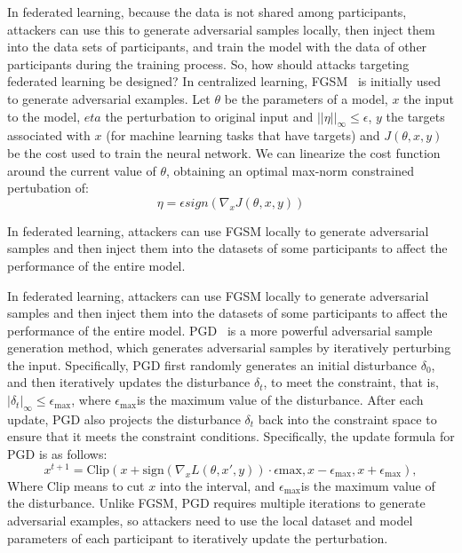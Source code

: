 \documentclass[a4paper,fleqn]{cas-dc}
\begin{document}
In federated learning, because the data is not shared
among participants, attackers can use this to generate
adversarial samples locally, then inject them into the data
sets of participants, and train the model with the data of
other participants during the training process.
So, how should attacks targeting federated learning be
designed? In centralized learning, FGSM~\cite{goodfellow2014explaining} is initially
used to generate adversarial examples. Let $\theta$ be the parameters of a model, $x$ the input to the model,
$eta$ the perturbation to original input and $||\eta||_\infty \le \epsilon$,
$y$ the targets associated with $x$ (for machine learning tasks that have targets)
and $J(\theta, x, y)$ be the cost used to train the neural network.
We can linearize the cost function around the current value of $\theta$,
obtaining an optimal max-norm constrained pertubation of:
\begin{equation}
	\eta = \epsilon sign(\nabla_x J(\theta,x,y))
\end{equation}

In federated learning, attackers can use FGSM locally to generate
adversarial samples and then inject them into the datasets of some participants
to affect the performance of the entire model.

In federated learning, attackers can use FGSM locally
to generate adversarial samples and then inject them into
the datasets of some participants to affect the performance
of the entire model. PGD~\cite{madry2017towards} is a more powerful adversarial sample
generation method, which generates adversarial samples
by iteratively perturbing the input. Specifically, PGD
first randomly generates an initial disturbance $\delta_0$,
and then iteratively updates the disturbance $\delta_t$, to meet the constraint,
that is, $|\delta_t|_{\infty} \leq \epsilon_{\text{max}}$,
where $\epsilon_{\text{max}}$is the maximum value of the disturbance.
After each update, PGD also projects the disturbance
$\delta_t$ back into the constraint space to ensure that it meets the
constraint conditions.
Specifically, the update formula for PGD is as follows:
\begin{equation}
	x^{t+1} = \text{Clip}(x + \text{sign}(\nabla_x L(\theta,x',y)) \cdot \epsilon{\text{max}}, x - \epsilon_{\text{max}}, x + \epsilon_{\text{max}}),
\end{equation}
Where $\text{Clip}$ means to cut $x$ into the interval, and $\epsilon_ {\text{max}} $is the maximum value of the disturbance.
Unlike FGSM, PGD requires multiple iterations to generate adversarial examples,
so attackers need to use the local dataset and model parameters of each participant
to iteratively update the perturbation.
\end{document}
